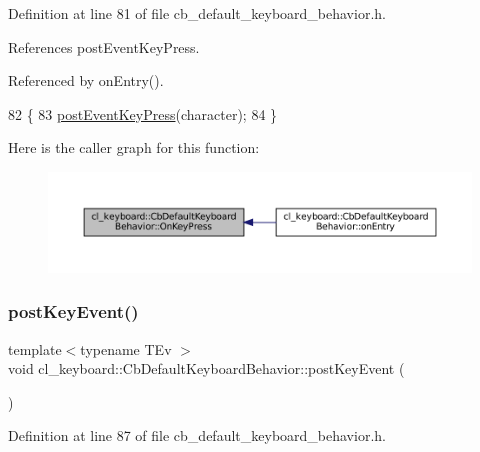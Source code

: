 Definition at line 81 of file cb\+\_\+default\+\_\+keyboard\+\_\+behavior.\+h.



References post\+Event\+Key\+Press.



Referenced by on\+Entry().


\begin{DoxyCode}
82     \{
83         \hyperlink{classcl__keyboard_1_1CbDefaultKeyboardBehavior_abd29833a0f94aa1d5aa1834d15ab1281}{postEventKeyPress}(character);
84     \}
\end{DoxyCode}
Here is the caller graph for this function\+:
\nopagebreak
\begin{figure}[H]
\begin{center}
\leavevmode
\includegraphics[width=350pt]{classcl__keyboard_1_1CbDefaultKeyboardBehavior_aa834f8e626a306920e536e7535041ac3_icgraph}
\end{center}
\end{figure}
\mbox{\label{classcl__keyboard_1_1CbDefaultKeyboardBehavior_afe6105db2d58fee99754cb4a47835988}} 
\subsubsection{\texorpdfstring{post\+Key\+Event()}{postKeyEvent()}}
{\footnotesize\ttfamily template$<$typename T\+Ev $>$ \\
void cl\+\_\+keyboard\+::\+Cb\+Default\+Keyboard\+Behavior\+::post\+Key\+Event (\begin{DoxyParamCaption}{ }\end{DoxyParamCaption})\hspace{0.3cm}{\ttfamily [inline]}}



Definition at line 87 of file cb\+\_\+default\+\_\+keyboard\+\_\+behavior.\+h.



